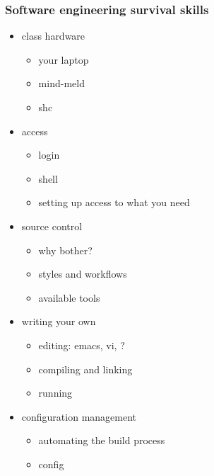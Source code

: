 %
%
%
%


% 
\begin{frame}[fragile]
%
  \frametitle{Software engineering survival skills}
%
  \begin{itemize}
%
  \item class hardware
    \begin{itemize}
    \item your laptop
    \item mind-meld
    \item shc
    \end{itemize}
%
  \item access
    \begin{itemize}
    \item login
    \item shell
    \item setting up access to what you need
    \end{itemize}
%
  \item source control
    \begin{itemize}
    \item why bother?
    \item styles and workflows
    \item available tools
    \end{itemize}
%
  \item writing your own
    \begin{itemize}
    \item editing: emacs, vi, ?
    \item compiling and linking
    \item running
    \end{itemize}
%
  \item configuration management
    \begin{itemize}
    \item automating the build process
    \item config
    \end{itemize}
%
  \end{itemize}
%
\end{frame}

